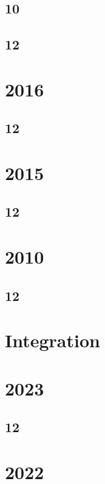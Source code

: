 \subsection{10}

\subsection{12}


\section{2016}
\subsection{12}



\section{2015}
\subsection{12}


\section{2010}
\subsection{12}







\section{Integration}
\section{2023}
\subsection{12}

\section{2022}
